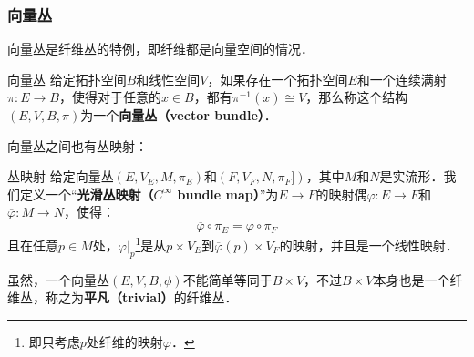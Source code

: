 \subsubsection{向量丛}
向量丛是纤维丛的特例，即纤维都是向量空间的情况．

\begin{definition}{向量丛}
给定拓扑空间$B$和线性空间$V$，如果存在一个拓扑空间$E$和一个连续满射$\pi:E\rightarrow B$，使得对于任意的$x\in B$，都有$\pi^{-1}(x)\cong V$，那么称这个结构$(E, V, B, \pi)$为一个\textbf{向量丛（vector bundle）}．
\end{definition}

向量丛之间也有丛映射：

\begin{definition}{丛映射}
给定向量丛$(E, V_E, M, \pi_E)$和$(F, V_F, N, \pi_F])$，其中$M$和$N$是实流形．我们定义一个“\textbf{光滑丛映射（$C^\infty$ bundle map）}”为$E\rightarrow F$的映射偶$\varphi: E\rightarrow F$和$\overline{\varphi}: M\rightarrow N$，使得：
\begin{equation}
\overline{\varphi}\circ\pi_E=\varphi\circ\pi_F
\end{equation}
且在任意$p\in M$处，$\varphi|_p$\footnote{即只考虑$p$处纤维的映射$\varphi$．}是从$p\times V_E$到$\overline{\varphi}(p)\times V_F$的映射，并且是一个线性映射．
\end{definition}

虽然，一个向量丛$(E, V, B, \phi)$不能简单等同于$B\times V$，不过$B\times V$本身也是一个纤维丛，称之为\textbf{平凡（trivial）}的纤维丛．




